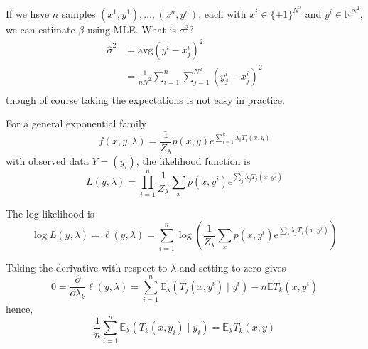 \documentclass[12pt]{report}
\renewcommand{\hat}[1]{\widehat{#1}}
\newcommand{\R}{\mathbb{R}}
\newcommand{\E}{\mathbb{E}}
\begin{document}
If we hsve $n$ samples $(x^1, y^1), \dots, (x^n, y^n)$, each with $x^i \in \{\pm 1\}^{N^2}$ and $y^i \in \R^{N^2}$, we can estimate $\beta$ using MLE. What is $\sigma^2$?
\begin{align*}
	\hat \sigma^2 & = \text{avg}(y^i - x_j^i)^2                                      \\
	              & = \frac{1}{nN^2} \sum_{i=1}^n \sum_{j=1}^{N^2} (y_j^i - x_j^i)^2 \\
\end{align*}
though of course taking the expectations is not easy in practice.

For a general exponential family
\[f(x, y, \lambda) = \frac{1}{Z_{\lambda}} p(x, y) e^{\sum_{i=1}^k \lambda_i T_i(x, y)}\]
with observed data $Y = (y_i)$, the likelihood function is
\[L(y, \lambda) = \prod_{i=1}^n \frac{1}{Z_{\lambda}}\sum_x p(x, y^i) e^{\sum_j \lambda_j T_j(x, y^j)}\]

The log-likelihood is
\[\log L(y, \lambda) = \ell(y, \lambda) = \sum_{i=1}^n \log \left(\frac{1}{Z_{\lambda}} \sum_x p(x, y^i) e^{\sum_j \lambda_j T_j(x, y^j)}\right)\]

Taking the derivative with respect to $\lambda$ and setting to zero gives
\[0 = \frac{\partial }{\partial \lambda_k} \ell(y, \lambda) = \sum_{i=1}^n \E_{\lambda} (T_j(x, y^i) \; | \; y^i) - n\E T_k(x, y^i)\]
hence,
\[\frac{1}{n} \sum_{i=1}^n \E_{\lambda} (T_k(x, y_i) \; | \; y_i) = \E_{\lambda} T_k(x, y)\]
\end{document}
